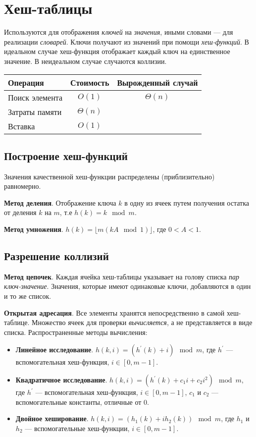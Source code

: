 \section{Хеш-таблицы}
\label{sec:hash-tables}

Используются для отображения \emph{ключей} на \emph{значения}, иными словами --- для реализации \emph{словарей}. Ключи получают из значений при помощи \emph{хеш-функций}. В идеальном случае хеш-функция отображает каждый ключ на единственное значение. В неидеальном случае случаются коллизии.

\begin{center}
  \begin{tabular}{lcc}
    \toprule
    Операция & Стоимость & Вырожденный случай \\
    \midrule
    Поиск элемента & $O(1)$ & $\Theta(n)$ \\
    Затраты памяти & $\Theta(n)$ & \\
    Вставка & $O(1)$ & \\
    \bottomrule
  \end{tabular}
\end{center}

\subsection{Построение хеш-функций}
Значения качественной хеш-функции распределены (приблизительно) равномерно.

\textbf{Метод деления}. Отображение ключа $k$ в одну из ячеек путем получения остатка от деления $k$ на $m$, т.е $h(k) = k \mod m$.

\textbf{Метод умножения}. $h(k) = \lfloor m (kA \mod 1) \rfloor$, где $0 < A < 1$.

\subsection{Разрешение коллизий}
\textbf{Метод цепочек}. Каждая ячейка хеш-таблицы указывает на голову списка \emph{пар ключ-значение}. Значения, которые имеют одинаковые ключи, добавляются в один и то же список.

\textbf{Открытая адресация}. Все элементы хранятся непосредственно в самой хеш-таблице. Множество ячеек для проверки \emph{вычисляется}, а не представляется в виде списка. Распространенные методы вычисления:
\begin{itemize}
  \item \textbf{Линейное исследование}. $h(k, i) = (h^{'}(k) + i) \mod m$, где $h^{'}$ --- вспомогательная хеш-функция, $i \in [0, m -1 ]$.
  \item \textbf{Квадратичное исследование}. $h(k, i) = (h^{'}(k) + c_1i + c_2i^2) \mod m$, где $h^{'}$ --- вспомогательная хеш-функция, $i \in [0, m -1 ]$, $c_1$ и $c_2$ --- вспомогательные константы, отличные от $0$.
  \item \textbf{Двойное хеширование}. $h(k, i) = (h_1(k) + ih_2(k)) \mod m$, где $h_1$ и $h_2$ --- вспомогательные хеш-функции, $i \in [0, m -1 ]$.
\end{itemize}

